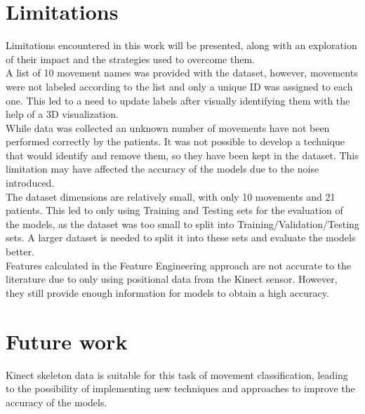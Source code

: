     \section{Limitations}

        Limitations encountered in this work will be presented, along with an exploration of their impact and the strategies used to overcome them. \\

        A list of 10 movement names was provided with the dataset, however, movements were not labeled according to the list and only a unique ID was assigned to each one. This led to a need to update labels after visually identifying them with the help of a 3D visualization. \\
        While data was collected an unknown number of movements have not been performed correctly by the patients. It was not possible to develop a technique that would identify and remove them, so they have been kept in the dataset. This limitation may have affected the accuracy of the models due to the noise introduced.\\

        The dataset dimensions are relatively small, with only 10 movements and 21 patients. This led to only using Training and Testing sets for the evaluation of the models, as the dataset was too small to split into Training/Validation/Testing sets. A larger dataset is needed to split it into these sets and evaluate the models better. \\
        Features calculated in the Feature Engineering approach are not accurate to the literature due to only using positional data from the Kinect sensor. However, they still provide enough information for models to obtain a high accuracy.

    \section{Future work}      

        Kinect skeleton data is suitable for this task of movement classification, leading to the possibility of implementing new techniques and approaches to improve the accuracy of the models. \\

